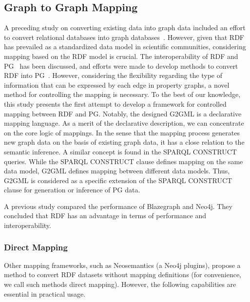 \documentclass[runningheads]{llncs}
\begin{document}
\subsection{Graph to Graph Mapping}
A preceding study on converting existing data into graph data included an effort to convert relational databases into graph databases~\cite{virgilio1}. 
However, given that RDF has prevailed as a standardized data model in scientific communities, considering mapping based on the RDF model is crucial. The interoperability of RDF and PG~\cite{hartig,angles4,das,thakkar} has been discussed, and efforts were made to develop methods to convert RDF into PG~\cite{tomaszuk1,virgilio}. However, considering the flexibility regarding the type of information that can be expressed by each edge in property graphs, a novel method for controlling the mapping is necessary.
To the best of our knowledge, this study presents the first attempt to develop a framework for controlled mapping between RDF and PG. 
Notably, the designed G2GML is a declarative mapping language. 
As a merit of the declarative description, we can concentrate on the core logic of mappings. In the sense that the mapping process generates new graph data on the basis of existing graph data, it has a close relation to the semantic inference. A similar concept is found in the SPARQL CONSTRUCT queries. While the SPARQL CONSTRUCT clause defines mapping on the same data model, G2GML defines mapping between different data models. 
Thus, G2GML is considered as a specific extension of the SPARQL CONSTRUCT clause for generation or inference of PG data.

A previous study compared the performance of Blazegraph and Neo4j. They concluded that RDF has an advantage in terms of performance and interoperability.


\subsubsection{Direct Mapping}

Other mapping frameworks, such as Neosemantics (a Neo4j plugins), propose a method to convert RDF datasets without mapping definitions (for convenience, we call such methods direct mapping). However, the following capabilities are essential in practical usage.
\end{document}
